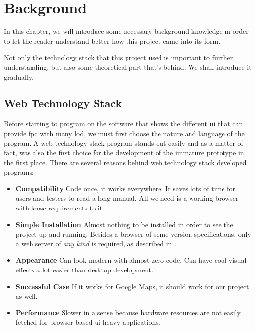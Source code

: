 
\chapter{Background} %

\label{Chapter2} %

In this chapter, we will introduce some necessary background knowledge in order to let the reader understand better how this project came into its form.

Not only the technology stack that this project used is important to further understanding, but also some theoretical part that's behind. We shall introduce it gradually.


\section{Web Technology Stack}

Before starting to program on the software that shows the different \gls{ui} that can provide \gls{fpc} with many \gls{lod}, we must first choose the nature and language of the program. A web technology stack program stands out easily and as a matter of fact, was also the first choice for the development of the immature prototype in the first place. There are several reasons behind web technology stack developed programs:

\begin{itemize}
    \item \textbf{Compatibility} Code once, it works everywhere. It saves lots of time for users and testers to read a long manual. All we need is a working browser with loose requirements to it.
    \item \textbf{Simple Installation} Almost nothing to be installed in order to see the project up and running. Besides a browser of some version specifications, only a web server of \emph{any kind} is required, as described in .
    \item \textbf{Appearance} Can look modern with almost zero code. Can have cool visual effects a lot easier than desktop development. 
    \item \textbf{Successful Case} If it works for Google Maps, it should work for our project as well.
    \item \textbf{Performance} Slower in a sense because hardware resources are not easily fetched for browser-based \gls{ui} heavy applications.
\end{itemize}

